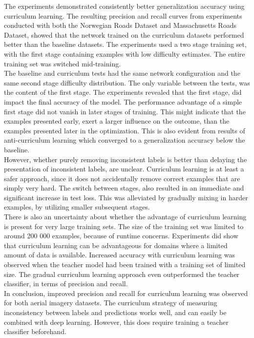 The experiments demonstrated consistently better generalization accuracy using curriculum learning. The resulting precision and recall curves from experiments conducted with both the Norwegian Roads Dataset and Massachusetts Roads Dataset, showed that the network trained on the curriculum datasets performed better than the baseline datasets. The experiments used a two stage training set, with the first stage containing examples with low difficulty estimates. The entire training set was switched mid-training. \\

The baseline and curriculum tests had the same network configuration and the same second stage difficulty distribution. The only variable between the tests, was the content of the first stage. The experiments revealed that the first stage, did impact the final accuracy of the model. The performance advantage of a simple first stage did not vanish in later stages of training. This might indicate that the examples presented early, exert a larger influence on the outcome, than the examples presented later in the optimization. This is also evident from results of anti-curriculum learning which converged to a generalization accuracy below the baseline. \\

However, whether purely removing inconsistent labels is better than delaying the presentation of inconsistent labels, are unclear. Curriculum learning is at least a safer approach, since it does not accidentally remove correct examples that are simply very hard. The switch between stages, also resulted in an immediate and significant increase in test loss. This was alleviated by gradually mixing in harder examples, by utilizing smaller subsequent stages.\\

There is also an uncertainty about whether the advantage of curriculum learning is present for very large training sets. The size of the training set was limited to around 200 000 examples, because of runtime concerns. Experiments did show that curriculum learning can be advantageous for domains where a limited amount of data is available. Increased accuracy with curriculum learning was observed when the teacher model had been trained with a training set of limited size. The gradual curriculum learning approach even outperformed the teacher classifier, in terms of precision and recall.\\

In conclusion, improved precision and recall for curriculum learning was observed for both aerial imagery datasets. The curriculum strategy of measuring inconsistency between labels and predictions works well, and can easily be combined with deep learning. However, this does require training a teacher classifier beforehand.



